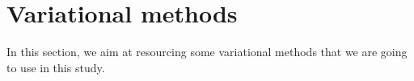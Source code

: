 \section{Variational methods}

In this section, we aim at resourcing some variational methods that we are going to use in this study.